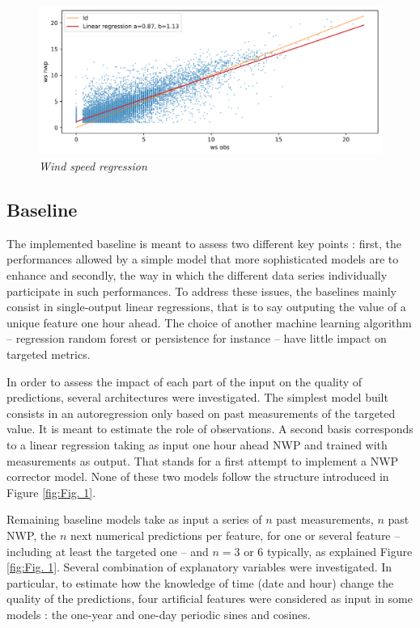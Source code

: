 \documentclass{article}
\newcommand{\saut}{\vspace{10px}}
\begin{document}
\begin{figure}[H]
    \centering
    \includegraphics[width=\linewidth]{img/ws_compare.png}
    \caption{\textit{Wind speed regression}}
   \label{ws_straight}
\end{figure}

\subsection*{Baseline}

The implemented baseline is meant to assess two different key points : first, the performances allowed by a simple
model that more sophisticated models are to enhance and secondly, the way in which the different data
series individually participate in such performances. To address these issues, the baselines mainly consist in single-output
linear regressions, that is to say outputing the value of a unique feature one hour ahead.
The choice of another machine learning algorithm -- regression random forest or persistence for instance -- have little
impact on targeted metrics.

\saut

In order to assess the impact of each part of the input on the quality of predictions, several architectures were investigated.
The simplest model built consists in an autoregression only based on past measurements of the targeted value.
It is meant to estimate the role of observations. A second basis corresponds to a linear regression taking as input
one hour ahead NWP and trained with measurements as output. That stands for a first attempt to implement a
NWP corrector model. None of these two models follow the structure introduced in Figure \ref{fig:Fig. 1}.

\saut

Remaining baseline models take as input a series of $n$ past measurements, $n$ past NWP, the $n$ next
numerical predictions per feature, for one or several feature -- including at least the targeted one -- and $n = 3$ or
$6$ typically, as explained Figure \ref{fig:Fig. 1}. Several combination of explanatory variables were investigated.
In particular, to estimate how the knowledge of time (date and hour) change the quality of the predictions,
four artificial features were considered as input in some models : the one-year and one-day periodic sines and cosines.
\end{document}
